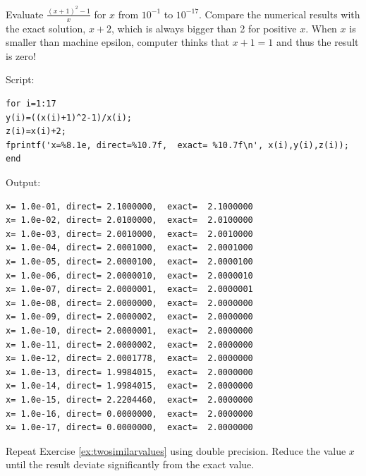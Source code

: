 \begin{example}
\label{ex:twosimilarvalues}
Evaluate $\displaystyle\frac{(x+1)^2-1}{x}$ for $x$ from $10^{-1}$ to $10^{-17}$.
Compare the numerical results with the exact solution, $x+2$, which is always bigger than 2 for positive $x$.  When $x$ is smaller than machine epsilon, computer thinks that $x+1=1$ and thus the result is zero!
\small
\begin{mybox}
Script:

	\begin{verbatim}
for i=1:17
y(i)=((x(i)+1)^2-1)/x(i);
z(i)=x(i)+2;
fprintf('x=%8.1e, direct=%10.7f,  exact= %10.7f\n', x(i),y(i),z(i));
end
   \end{verbatim}

\medskip
Output:
	\begin{verbatim}
x= 1.0e-01, direct= 2.1000000,  exact=  2.1000000
x= 1.0e-02, direct= 2.0100000,  exact=  2.0100000
x= 1.0e-03, direct= 2.0010000,  exact=  2.0010000
x= 1.0e-04, direct= 2.0001000,  exact=  2.0001000
x= 1.0e-05, direct= 2.0000100,  exact=  2.0000100
x= 1.0e-06, direct= 2.0000010,  exact=  2.0000010
x= 1.0e-07, direct= 2.0000001,  exact=  2.0000001
x= 1.0e-08, direct= 2.0000000,  exact=  2.0000000
x= 1.0e-09, direct= 2.0000002,  exact=  2.0000000
x= 1.0e-10, direct= 2.0000001,  exact=  2.0000000
x= 1.0e-11, direct= 2.0000002,  exact=  2.0000000
x= 1.0e-12, direct= 2.0001778,  exact=  2.0000000
x= 1.0e-13, direct= 1.9984015,  exact=  2.0000000
x= 1.0e-14, direct= 1.9984015,  exact=  2.0000000
x= 1.0e-15, direct= 2.2204460,  exact=  2.0000000
x= 1.0e-16, direct= 0.0000000,  exact=  2.0000000
x= 1.0e-17, direct= 0.0000000,  exact=  2.0000000
   \end{verbatim}
\end{mybox}
\normalsize
\end{example} 

\noindent
\exercise
Repeat Exercise \ref{ex:twosimilarvalues} using double precision.  Reduce the value $x$ until the result deviate significantly from the exact value.

